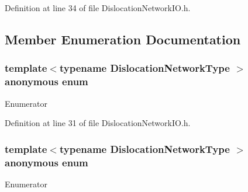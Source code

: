 Definition at line 34 of file Dislocation\+Network\+I\+O.\+h.



\subsection{Member Enumeration Documentation}
\hypertarget{structmodel_1_1_dislocation_network_i_o_afebd5810a8f781fc5f1356f0cf3686e6}{}\subsubsection[{anonymous enum}]{\setlength{\rightskip}{0pt plus 5cm}template$<$typename Dislocation\+Network\+Type $>$ anonymous enum}\label{structmodel_1_1_dislocation_network_i_o_afebd5810a8f781fc5f1356f0cf3686e6}
\begin{Desc}
\item[Enumerator]\par
\begin{description}
\item[{\em 
\hypertarget{structmodel_1_1_dislocation_network_i_o_afebd5810a8f781fc5f1356f0cf3686e6a5050bb137fe63ff3d177471c58326223}{}dim\label{structmodel_1_1_dislocation_network_i_o_afebd5810a8f781fc5f1356f0cf3686e6a5050bb137fe63ff3d177471c58326223}
}]\end{description}
\end{Desc}


Definition at line 31 of file Dislocation\+Network\+I\+O.\+h.

\hypertarget{structmodel_1_1_dislocation_network_i_o_aa8ad28f2a51e326f2af17078baf5a640}{}\subsubsection[{anonymous enum}]{\setlength{\rightskip}{0pt plus 5cm}template$<$typename Dislocation\+Network\+Type $>$ anonymous enum}\label{structmodel_1_1_dislocation_network_i_o_aa8ad28f2a51e326f2af17078baf5a640}
\begin{Desc}
\item[Enumerator]\par
\begin{description}
\item[{\em 
\hypertarget{structmodel_1_1_dislocation_network_i_o_aa8ad28f2a51e326f2af17078baf5a640ad3e208a5afeac025d2e479ff844c32f1}{}Ndof\+Xnode\label{structmodel_1_1_dislocation_network_i_o_aa8ad28f2a51e326f2af17078baf5a640ad3e208a5afeac025d2e479ff844c32f1}
}]\end{description}
\end{Desc}


